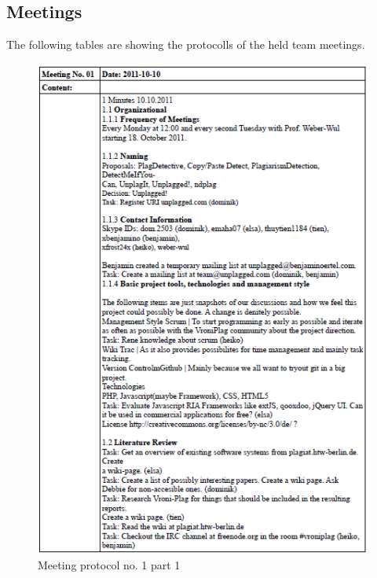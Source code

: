 
\begin{appendix}

\chapter{Meetings}\label{ch:Meetings}
The following tables are showing the protocolls of the held team meetings.

\begin{figure}
  \centering
    \includegraphics[width=\textwidth]{images/a_meetings/meeting_01a.png}
  \caption{Meeting protocol no. 1 part 1}
  \label{fig:meeting protocol no. 1 part 1}
\end{figure}


\end{appendix}
